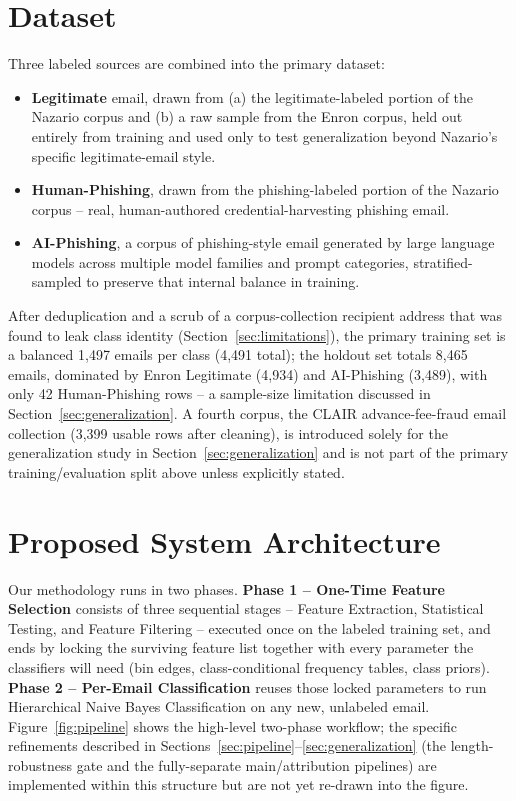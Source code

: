 \documentclass[11pt]{article}
\begin{document}
\section{Dataset}
\label{sec:dataset}
Three labeled sources are combined into the primary dataset:
\begin{itemize}
    \item \textbf{Legitimate} email, drawn from (a) the legitimate-labeled portion of the Nazario
      corpus and (b) a raw sample from the Enron corpus, held out entirely from training and used
      only to test generalization beyond Nazario's specific legitimate-email style.
    \item \textbf{Human-Phishing}, drawn from the phishing-labeled portion of the Nazario
      corpus -- real, human-authored credential-harvesting phishing email.
    \item \textbf{AI-Phishing}, a corpus of phishing-style email generated by large language
      models across multiple model families and prompt categories, stratified-sampled to
      preserve that internal balance in training.
\end{itemize}
After deduplication and a scrub of a corpus-collection recipient address that was found to leak
class identity (Section~\ref{sec:limitations}), the primary training set is a balanced 1{,}497
emails per class (4{,}491 total); the holdout set totals 8{,}465 emails, dominated by Enron
Legitimate (4{,}934) and AI-Phishing (3{,}489), with only 42 Human-Phishing rows -- a sample-size
limitation discussed in Section~\ref{sec:generalization}. A fourth corpus, the CLAIR
advance-fee-fraud email collection (3{,}399 usable rows after cleaning), is introduced solely for
the generalization study in Section~\ref{sec:generalization} and is not part of the primary
training/evaluation split above unless explicitly stated.

\section{Proposed System Architecture}
Our methodology runs in two phases. \textbf{Phase 1 -- One-Time Feature Selection} consists of
three sequential stages -- Feature Extraction, Statistical Testing, and Feature Filtering -- executed
once on the labeled training set, and ends by locking the surviving feature list together with every
parameter the classifiers will need (bin edges, class-conditional frequency tables, class priors).
\textbf{Phase 2 -- Per-Email Classification} reuses those locked parameters to run Hierarchical
Naive Bayes Classification on any new, unlabeled email. Figure~\ref{fig:pipeline} shows the
high-level two-phase workflow; the specific refinements described in
Sections~\ref{sec:pipeline}--\ref{sec:generalization} (the length-robustness gate and the
fully-separate main/attribution pipelines) are implemented within this structure but are not yet
re-drawn into the figure.
\end{document}
